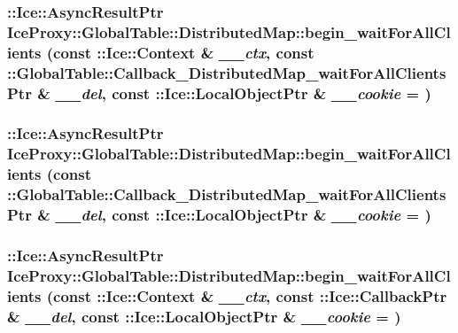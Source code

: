 \label{class_ice_proxy_1_1_global_table_1_1_distributed_map_a362f376d77d5638e940aecc543faf8f3}
\hypertarget{class_ice_proxy_1_1_global_table_1_1_distributed_map_a2e8a0463f9adebd2d3d967daf07515ab}{
\subsubsection[{begin\_\-waitForAllClients}]{\setlength{\rightskip}{0pt plus 5cm}::Ice::AsyncResultPtr IceProxy::GlobalTable::DistributedMap::begin\_\-waitForAllClients (const ::Ice::Context \& {\em \_\-\_\-ctx}, \/  const ::{\bf GlobalTable::Callback\_\-DistributedMap\_\-waitForAllClientsPtr} \& {\em \_\-\_\-del}, \/  const ::Ice::LocalObjectPtr \& {\em \_\-\_\-cookie} = {})}}
\label{class_ice_proxy_1_1_global_table_1_1_distributed_map_a2e8a0463f9adebd2d3d967daf07515ab}
\hypertarget{class_ice_proxy_1_1_global_table_1_1_distributed_map_a046d0ae195ef45e35d3fe8d2c8cb6baf}{
\subsubsection[{begin\_\-waitForAllClients}]{\setlength{\rightskip}{0pt plus 5cm}::Ice::AsyncResultPtr IceProxy::GlobalTable::DistributedMap::begin\_\-waitForAllClients (const ::{\bf GlobalTable::Callback\_\-DistributedMap\_\-waitForAllClientsPtr} \& {\em \_\-\_\-del}, \/  const ::Ice::LocalObjectPtr \& {\em \_\-\_\-cookie} = {})}}
\label{class_ice_proxy_1_1_global_table_1_1_distributed_map_a046d0ae195ef45e35d3fe8d2c8cb6baf}
\hypertarget{class_ice_proxy_1_1_global_table_1_1_distributed_map_abf099130b62fb48def9a78f2a05b290f}{
\subsubsection[{begin\_\-waitForAllClients}]{\setlength{\rightskip}{0pt plus 5cm}::Ice::AsyncResultPtr IceProxy::GlobalTable::DistributedMap::begin\_\-waitForAllClients (const ::Ice::Context \& {\em \_\-\_\-ctx}, \/  const ::Ice::CallbackPtr \& {\em \_\-\_\-del}, \/  const ::Ice::LocalObjectPtr \& {\em \_\-\_\-cookie} = {})}}
